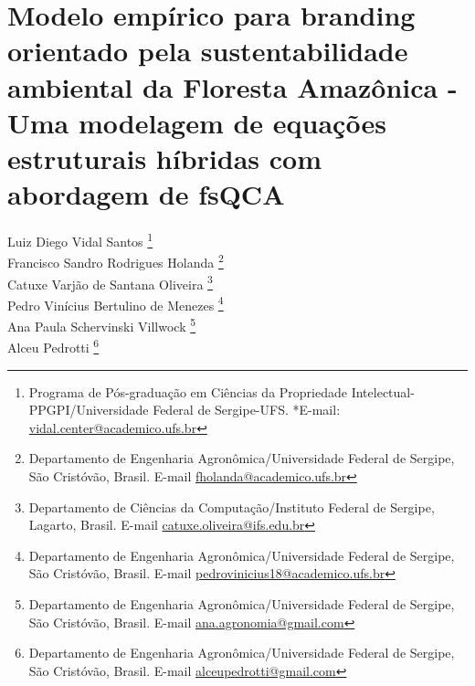 \chapter{Modelo empírico para branding orientado pela sustentabilidade ambiental da Floresta Amazônica - Uma modelagem de equações estruturais híbridas com abordagem de fsQCA}

\begin{flushright}
Luiz Diego Vidal Santos  \footnote[1]{Programa de Pós-graduação em Ciências da Propriedade Intelectual-PPGPI/Universidade Federal de Sergipe-UFS. *E-mail:  \href{mailto:vidal.center@academico.ufs.br}{vidal.center@academico.ufs.br}}
\\[0.2cm] 
Francisco Sandro Rodrigues Holanda \footnote[2]{Departamento de Engenharia Agronômica/Universidade Federal de Sergipe, São Cristóvão, Brasil. E-mail \href{mailto:fholanda@academico.ufs.br}{fholanda@academico.ufs.br}}
\\[0.2cm] 
Catuxe Varjão de Santana Oliveira \footnote[3]{Departamento de Ciências da Computação/Instituto Federal de Sergipe, Lagarto, Brasil. E-mail \href{mailto:catuxe.oliveira@ifs.edu.br}{catuxe.oliveira@ifs.edu.br}}
\\[0.2cm] 
Pedro Vinícius Bertulino de Menezes \footnote[2]{Departamento de Engenharia Agronômica/Universidade Federal de Sergipe, São Cristóvão, Brasil. E-mail \href{mailto:pedrovinicius18@academico.ufs.br}{pedrovinicius18@academico.ufs.br}}
\\[0.2cm] 
Ana Paula Schervinski Villwock \footnote[2]{Departamento de Engenharia Agronômica/Universidade Federal de Sergipe, São Cristóvão, Brasil. E-mail \href{mailto:ana.agronomia@gmail.com}{ana.agronomia@gmail.com}}
\\[0.2cm] 
Alceu Pedrotti \footnote[2]{Departamento de Engenharia Agronômica/Universidade Federal de Sergipe, São Cristóvão, Brasil. E-mail \href{mailto:alceupedrotti@gmail.com}{alceupedrotti@gmail.com}}
\end{flushright}

